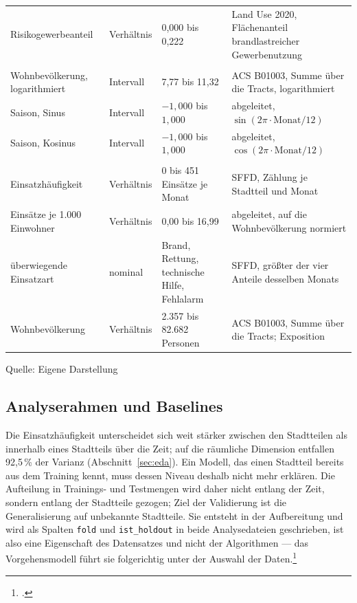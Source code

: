 \documentclass[12pt,a4paper]{article}
\newcommand{\tabquelle}[1][Eigene Darstellung]{%
  \par\setlength{\parskip}{0pt}\vspace{3pt}%
  {\setstretch{1}\fontsize{9pt}{11pt}\selectfont\raggedright Quelle: #1\par}%
}
\begin{document}
\begin{table}[htbp]
\begin{tabularx}{\textwidth}{@{}L{3.4cm} L{2.0cm} L{3.6cm} Y@{}}
        Risikogewerbeanteil & Verhältnis & 0,000 bis 0,222 & Land Use 2020, Flächenanteil brandlastreicher Gewerbenutzung \\
        \addlinespace
         \\
        Wohnbevölkerung, logarithmiert & Intervall & 7,77 bis 11,32 & ACS B01003, Summe über die Tracts, logarithmiert \\
        Saison, Sinus & Intervall & $-1{,}000$ bis $1{,}000$ & abgeleitet, $\sin(2\pi \cdot \mathrm{Monat}/12)$ \\
        Saison, Kosinus & Intervall & $-1{,}000$ bis $1{,}000$ & abgeleitet, $\cos(2\pi \cdot \mathrm{Monat}/12)$ \\
        \addlinespace
         \\
        Einsatzhäufigkeit & Verhältnis & 0 bis 451 Einsätze je Monat & SFFD, Zählung je Stadtteil und Monat \\
        Einsätze je 1.000 Einwohner & Verhältnis & 0,00 bis 16,99 & abgeleitet, auf die Wohnbevölkerung normiert \\
        überwiegende Einsatzart & nominal & Brand, Rettung, technische Hilfe, Fehlalarm & SFFD, größter der vier Anteile desselben Monats \\
        Wohnbevölkerung & Verhältnis & 2.357 bis 82.682 Personen & ACS B01003, Summe über die Tracts; Exposition \\
        \bottomrule
    \end{tabularx}
    \tabquelle
\end{table}

\subsection{Analyserahmen und Baselines}
\label{sec:rahmen-baselines}

Die Einsatzhäufigkeit unterscheidet sich weit stärker zwischen den Stadtteilen
als innerhalb eines Stadtteils über die Zeit; auf die räumliche Dimension
entfallen 92,5\,\% der Varianz (Abschnitt~\ref{sec:eda}). Ein Modell, das einen
Stadtteil bereits aus dem Training kennt, muss dessen Niveau deshalb nicht mehr
erklären. Die Aufteilung in Trainings- und Testmengen wird daher nicht entlang
der Zeit, sondern entlang der Stadtteile gezogen; Ziel der Validierung ist die
Generalisierung auf unbekannte Stadtteile. Sie entsteht in der Aufbereitung und
wird als Spalten \texttt{fold} und \texttt{ist\_holdout} in beide
Analysedateien geschrieben, ist also eine Eigenschaft des Datensatzes und nicht
der Algorithmen --- das Vorgehensmodell führt sie folgerichtig unter der
Auswahl der Daten.\footcite[23-26]{Chapman2000}
 
\end{document}
